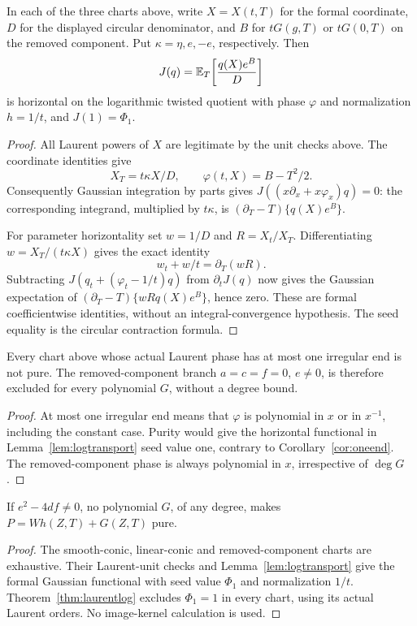 \begin{lemma}\label{lem:logtransport}
In each of the three charts above, write $X=X(t,T)$ for the formal
coordinate, $D$ for the displayed circular denominator, and $B$ for
$tG(g,T)$ or $tG(0,T)$ on the removed component. Put
$\kappa=\eta,e,-e$, respectively. Then
\[
 J(q)=\mathbb E_T\!\left[\frac{q(X)e^B}{D}\right]
\]
is horizontal on the logarithmic twisted quotient with phase
$\varphi$ and normalization $h=1/t$, and $J(1)=\Phi_1$.
\end{lemma}
\begin{proof}
All Laurent powers of $X$ are legitimate by the unit checks above.
The coordinate identities give
\[
 X_T=t\kappa X/D,\qquad
 \varphi(t,X)=B-T^2/2.
\]
Consequently Gaussian integration by parts gives
$J((x\partial_x+x\varphi_x)q)=0$: the corresponding integrand,
multiplied by $t\kappa$, is
$(\partial_T-T)\{q(X)e^B\}$.

For parameter horizontality set $w=1/D$ and $R=X_t/X_T$.
Differentiating $w=X_T/(t\kappa X)$ gives the exact identity
\[
 w_t+w/t=\partial_T(wR).
\]
Subtracting $J(q_t+(\varphi_t-1/t)q)$ from $\partial_tJ(q)$ now
gives the Gaussian expectation of
$(\partial_T-T)\{wR q(X)e^B\}$, hence zero. These are formal
coefficientwise identities, without an integral-convergence hypothesis.
The seed equality is the circular contraction formula.
\end{proof}

\begin{proposition}\label{prop:oneendgaussian}
Every chart above whose actual Laurent phase has at most one
irregular end is not pure. The removed-component branch
$a=c=f=0$, $e\ne0$, is therefore excluded for every polynomial $G$,
without a degree bound.
\end{proposition}
\begin{proof}
At most one irregular end means that $\varphi$ is polynomial in
$x$ or in $x^{-1}$, including the constant case. Purity would give
the horizontal functional in Lemma~\ref{lem:logtransport} seed value
one, contrary to Corollary~\ref{cor:oneend}. The removed-component
phase is always polynomial in $x$, irrespective of $\deg G$.
\end{proof}



\begin{proposition}\label{prop:nondeglog}
If $e^2-4df\ne0$, no polynomial $G$, of any degree, makes
$P=Wh(Z,T)+G(Z,T)$ pure.
\end{proposition}
\begin{proof}
The smooth-conic, linear-conic and removed-component charts are
exhaustive. Their Laurent-unit checks and
Lemma~\ref{lem:logtransport} give the formal Gaussian functional
with seed value $\Phi_1$ and normalization $1/t$.
Theorem~\ref{thm:laurentlog} excludes $\Phi_1=1$ in every chart,
using its actual Laurent orders. No image-kernel calculation is used.
\end{proof}

